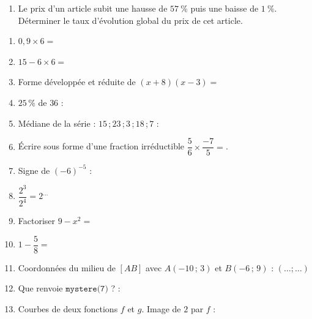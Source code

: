 \documentclass[a4paper,11pt]{article}
\begin{document}
\begin{seanceD}{}
\begin{enumerate}
\bigskip

\dotfill

\bigskip

\dotfill


\item   Le prix d'un article subit une hausse de $57~\%$ puis une baisse de $1~\%$.\\Déterminer le taux d'évolution global du prix de cet article.

\bigskip

\dotfill



\end{enumerate}

\end{seanceD}

\begin{seance}{} %
\begin{enumerate}
	\item $0{,}9 \times 6=$\dotfill
	\item  $15-6\times6=$\dotfill
	\item Forme développée et réduite de $(x+8)(x-3)=$\dotfill
	\item $25\,\%$ de $36$ : \dotfill
	\item Médiane de la série : $15$\,;\,$23$\,;\,$3$\,;\,$18$\,;\,$7$ : \dotfill
	\item Écrire sous forme d'une fraction irréductible $\dfrac{5}{6}\times \dfrac{-7}{5}=$. \dotfill
	\item Signe de  $(-6)^{-5}$  : \dotfill
	\item $\dfrac{2^{3}}{2^{4}}=2^{\ldots}$ 
	\item  Factoriser  $9-x^2=$\dotfill
	\item $1-\dfrac{5}{8}=$\dotfill
	\item Coordonnées du  milieu de $[AB]$ avec $A(-10\,;\,3)$ et $B(-6\,;\,9)$ :
$(\ldots;\ldots)$
	\item Que renvoie  $\texttt{mystere(7)}$ ? : \dotfill \medskip\hspace*{10mm}\newline
	\item Courbes de deux fonctions $f$ et $g$. Image de $2$ par $f$ : \dotfill\begin{tikzpicture}[baseline,scale = 0.5]


\end{tikzpicture}
\end{enumerate}
\end{seance}
\end{document}
